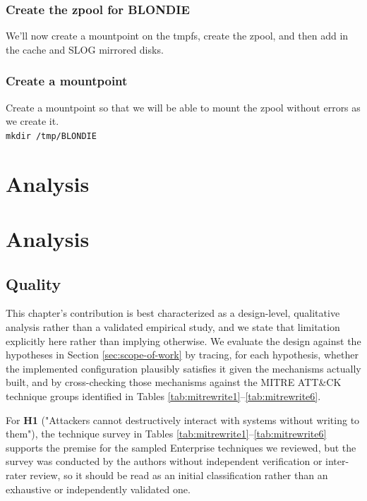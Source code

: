 \subsubsection{Create the zpool for BLONDIE}
We’ll now create a mountpoint on the tmpfs, create the zpool, and then add in the   \gls{cache} and SLOG \Gls{mirror}ed disks.
\subsubsection{Create a mountpoint}
Create a mountpoint so that we will be able to mount the zpool without errors as we create it.\\
\noindent\texttt{mkdir /tmp/BLONDIE}\\

\section{Analysis}
\section{Analysis}
\subsection{Quality}
This chapter's contribution is best characterized as a design-level, qualitative analysis rather than a validated empirical study, and we state that limitation explicitly here rather than implying otherwise.  We evaluate the design against the hypotheses in Section \ref{sec:scope-of-work} by tracing, for each hypothesis, whether the implemented \gls{configuration} plausibly satisfies it given the mechanisms actually built, and by cross-checking those mechanisms against the MITRE ATT\&CK technique groups identified in Tables \ref{tab:mitrewrite1}--\ref{tab:mitrewrite6}.

For \textbf{H1} ("Attackers cannot destructively interact with systems without writing to them"), the technique survey in Tables \ref{tab:mitrewrite1}--\ref{tab:mitrewrite6} supports the premise for the sampled Enterprise techniques we reviewed, but the survey was conducted by the authors without independent verification or inter-rater review, so it should be read as an initial classification rather than an exhaustive or independently validated one.

